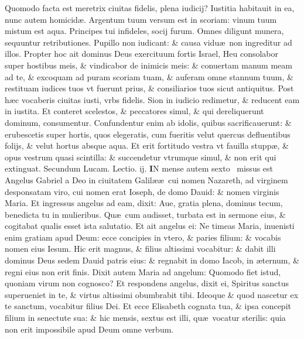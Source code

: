 \documentclass[a5paper,10pt]{book}
\def\rightmarginnote{%
	\lrmarginnote{\hskip\columnwidth \hskip -1em}}
\def\ae{æ}
\begin{document}
\begin{multicols*}{2}
Quomodo facta est meretrix ciuitas fidelis, plena iudicij?
Iustitia habitauit in ea, nunc autem homicid\ae .
Argentum tuum versum est in scoriam: vinum tuum mistum est aqua.
Principes tui infideles, socij furum.
Omnes diligunt munera, sequuntur retributiones.
Pupillo non iudicant: \& causa vidu\ae \ non ingreditur ad illos.
Propter hoc ait dominus Deus exercituum fortis Israel, Heu consolabor super hostibus meis, \& vindicabor de inimicis meis: \& conuertam manum meam ad te, \& excoquam ad puram scoriam tuam, \& auferam omne stannum tuum, \& restituam iudices tuos vt fuerunt prius, \& consiliarios tuos sicut antiquitus.
Post h\ae c vocaberis ciuitas iusti, vrbs fidelis.
Sion in iudicio redimetur, \& reducent eam in iustita.
Et conteret scelestos, \& peccatores simul, \& qui dereliquerunt dominum, consumentur.
Confundentur enim ab idolis, quibus sacrificauerunt: \& erubescetis super hortis, quos elegeratis, cum fueritis velut quercus defluentibus folijs, \& velut hortus absque aqua.
Et erit fortitudo vestra vt fauilla stupp\ae , \& opus vestrum quasi scintilla: \& succendetur vtrumque simul, \& non erit qui extinguat.
\fancyhead[C]{\color{red} Feria. ij. Dominic\ae . j. aduentus}
\color{red} Secundum Lucam. Lectio. ij.\color{black}
\vspace{-.25em}
\lettrine[lines=2]{\bfseries \color{red} I}{}N\rightmarginnote{ca. 1.\\C} mense autem sexto \textdagger \ missus est Angelus Gabriel a Deo in ciuitatem Galil\ae \ae \ cui nomen Nazareth, ad virginem desponsatam viro, cui nomen erat Ioseph, de domo Dauid: \& nomen virginis Maria.
Et ingressus angelus ad eam, dixit: Aue, gratia plena, dominus tecum, benedicta tu in mulieribus.
Qu\ae \ cum audisset, 
turbata est in sermone eius, \& cogitabat qualis esset ista salutatio.
Et ait angelus ei: Ne timeas Maria, inuenisti enim gratiam apud Deum: ecce concipies in vtero, \& paries filium: \& vocabis nomen eius Iesum.
Hic erit magnus, \& filius altissimi vocabitur: \& dabit illi dominus Deus sedem Dauid patris eius: \& regnabit in domo Iacob, in \ae ternum, \& regni eius non erit finis.
Dixit autem Maria ad angelum: Quomodo fiet istud, quoniam virum non cognosco?
Et respondens angelus, dixit ei, Spiritus sanctus superueniet in te, \& virtus altissimi obumbrabit tibi.
Ideoque \& quod nascetur ex te sanctum, vocabitur filius Dei.
Et ecce Elisabeth cognata tua, \& ipsa concepit filium in senectute sua: \& hic mensis, sextus est illi, qu\ae \ vocatur sterilis: quia non erit impossibile apud Deum omne verbum.

\end{multicols*}
\end{document}
